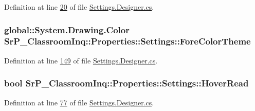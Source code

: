 \-Definition at line \hyperlink{_settings_8_designer_8cs_source_l00020}{20} of file \hyperlink{_settings_8_designer_8cs_source}{\-Settings.\-Designer.\-cs}.

\hypertarget{class_sr_p___classroom_inq_1_1_properties_1_1_settings_ad3f4ea6ca5ad5d11dc006818a104fb1b}{
\subsubsection[{\-Fore\-Color\-Theme}]{\setlength{\rightskip}{0pt plus 5cm}global\-::\-System.\-Drawing.\-Color \-Sr\-P\-\_\-\-Classroom\-Inq\-::\-Properties\-::\-Settings\-::\-Fore\-Color\-Theme}}
\label{class_sr_p___classroom_inq_1_1_properties_1_1_settings_ad3f4ea6ca5ad5d11dc006818a104fb1b}


\-Definition at line \hyperlink{_settings_8_designer_8cs_source_l00149}{149} of file \hyperlink{_settings_8_designer_8cs_source}{\-Settings.\-Designer.\-cs}.

\hypertarget{class_sr_p___classroom_inq_1_1_properties_1_1_settings_a9e2211fd7a7199dbfaa600115f7a2184}{
\subsubsection[{\-Hover\-Read}]{\setlength{\rightskip}{0pt plus 5cm}bool \-Sr\-P\-\_\-\-Classroom\-Inq\-::\-Properties\-::\-Settings\-::\-Hover\-Read}}
\label{class_sr_p___classroom_inq_1_1_properties_1_1_settings_a9e2211fd7a7199dbfaa600115f7a2184}


\-Definition at line \hyperlink{_settings_8_designer_8cs_source_l00077}{77} of file \hyperlink{_settings_8_designer_8cs_source}{\-Settings.\-Designer.\-cs}.

